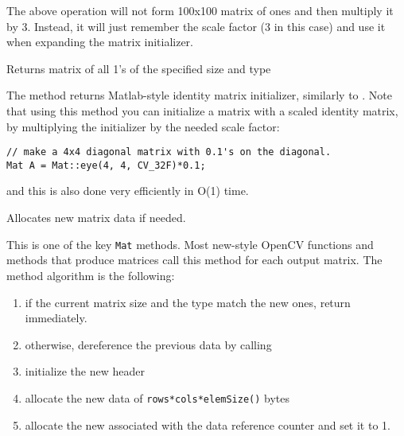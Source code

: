 The above operation will not form 100x100 matrix of ones and then multiply it by 3. Instead, it will just remember the scale factor (3 in this case) and use it when expanding the matrix initializer.

Returns matrix of all 1's of the specified size and type

\begin{description}
\end{description}

The method returns Matlab-style identity matrix initializer, similarly to . Note that using this method you can initialize a matrix with a scaled identity matrix, by multiplying the initializer by the needed scale factor:

\begin{lstlisting}
// make a 4x4 diagonal matrix with 0.1's on the diagonal.
Mat A = Mat::eye(4, 4, CV_32F)*0.1;
\end{lstlisting}

and this is also done very efficiently in O(1) time.

Allocates new matrix data if needed.

\begin{description}
\end{description}

This is one of the key \texttt{Mat} methods. Most new-style OpenCV functions and methods that produce matrices call this method for each output matrix. The method algorithm is the following:

\begin{enumerate}
\item if the current matrix size and the type match the new ones, return immediately.
\item otherwise, dereference the previous data by calling 
\item initialize the new header
\item allocate the new data of \texttt{rows*cols*elemSize()} bytes
\item allocate the new associated with the data reference counter and set it to 1.
\end{enumerate}

